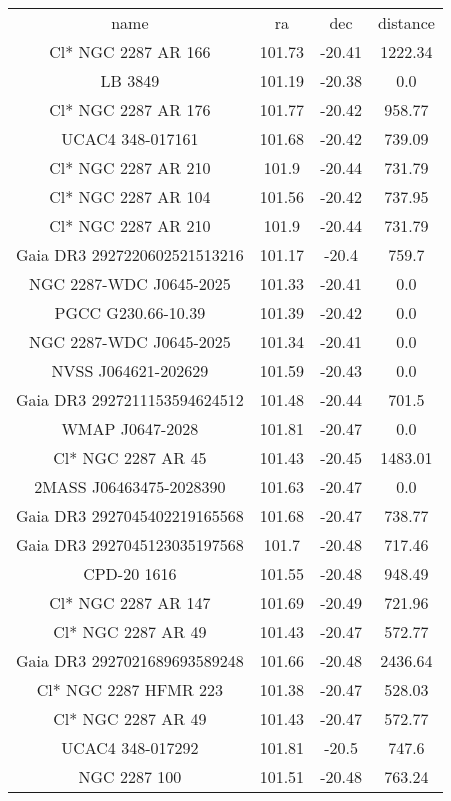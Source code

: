 \begin{table}
\begin{tabular}{cccc}
name & ra & dec & distance \\
Cl* NGC 2287     AR     166 & 101.73 & -20.41 & 1222.34 \\
LB  3849 & 101.19 & -20.38 & 0.0 \\
Cl* NGC 2287     AR     176 & 101.77 & -20.42 & 958.77 \\
UCAC4 348-017161 & 101.68 & -20.42 & 739.09 \\
Cl* NGC 2287     AR     210 & 101.9 & -20.44 & 731.79 \\
Cl* NGC 2287     AR     104 & 101.56 & -20.42 & 737.95 \\
Cl* NGC 2287     AR     210 & 101.9 & -20.44 & 731.79 \\
Gaia DR3 2927220602521513216 & 101.17 & -20.4 & 759.7 \\
[DDW2012] NGC 2287-WDC J0645-2025 & 101.33 & -20.41 & 0.0 \\
PGCC G230.66-10.39 & 101.39 & -20.42 & 0.0 \\
[DDW2012] NGC 2287-WDC J0645-2025 & 101.34 & -20.41 & 0.0 \\
NVSS J064621-202629 & 101.59 & -20.43 & 0.0 \\
Gaia DR3 2927211153594624512 & 101.48 & -20.44 & 701.5 \\
WMAP J0647-2028 & 101.81 & -20.47 & 0.0 \\
Cl* NGC 2287     AR      45 & 101.43 & -20.45 & 1483.01 \\
2MASS J06463475-2028390 & 101.63 & -20.47 & 0.0 \\
Gaia DR3 2927045402219165568 & 101.68 & -20.47 & 738.77 \\
Gaia DR3 2927045123035197568 & 101.7 & -20.48 & 717.46 \\
CPD-20  1616 & 101.55 & -20.48 & 948.49 \\
Cl* NGC 2287     AR     147 & 101.69 & -20.49 & 721.96 \\
Cl* NGC 2287     AR      49 & 101.43 & -20.47 & 572.77 \\
Gaia DR3 2927021689693589248 & 101.66 & -20.48 & 2436.64 \\
Cl* NGC 2287   HFMR     223 & 101.38 & -20.47 & 528.03 \\
Cl* NGC 2287     AR      49 & 101.43 & -20.47 & 572.77 \\
UCAC4 348-017292 & 101.81 & -20.5 & 747.6 \\
NGC  2287   100 & 101.51 & -20.48 & 763.24 \\

\end{tabular}
\end{table}
